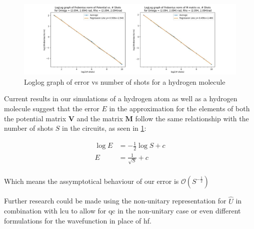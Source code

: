 \documentclass{aux/ttuthes2007}
\begin{document}
\begin{figure}[h!]
	\includegraphics[width=\linewidth]{img/M&V Graph.jpg}
  \caption{Loglog graph of error vs number of shots for a hydrogen molecule}
  \label{fig:2derrorgraph}
\end{figure}

Current results in our simulations of a hydrogen atom as well as a hydrogen molecule suggest that the error $E$ in the approximation for the elements of both the potential matrix $\bm V$ and the matrix $\bm M$ follow the same relationship with the number of shots $S$ in the circuits, as seen in \ref{fig:2derrorgraph}:

\begin{equation*}
	\begin{split}
		\log E &= -\frac 1 2 \log S + c \\
		E &= \frac 1 {\sqrt{S}} + c \\
	\end{split}
\end{equation*}

Which means the assymptotical behaviour of our error is $\mathcal O(S^{-\frac 1 2})$

Further research could be made using the non-unitary representation for $\hat U$ in combination with \gls{lcu} to allow for \gls{qc} in the non-unitary case or even different formulations for the wavefunction in place of \gls{hf}.


\backmatter





\glsaddall

\printnoidxglossary[type=acronym,sort=letter]
\end{document}
